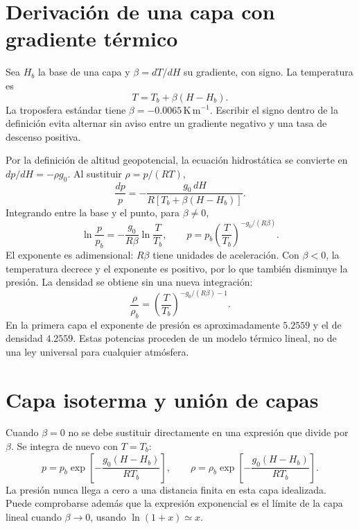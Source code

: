 \section{Derivación de una capa con gradiente térmico}
Sea $H_b$ la base de una capa y $\beta=dT/dH$ su gradiente, con signo. La temperatura es
\begin{equation}\label{eq:04-T}
 T=T_b+\beta(H-H_b).
\end{equation}
La troposfera estándar tiene $\beta=-0.0065\,\mathrm{K\,m^{-1}}$. Escribir el signo dentro de la definición evita alternar sin aviso entre un gradiente negativo y una tasa de descenso positiva.

Por la definición de altitud geopotencial, la ecuación hidrostática se convierte en $dp/dH=-\rho g_0$. Al sustituir $\rho=p/(RT)$,
\begin{equation}
 \frac{dp}{p}=-\frac{g_0\,dH}{R[T_b+\beta(H-H_b)]}.
\end{equation}
Integrando entre la base y el punto, para $\beta\ne0$,
\begin{equation}\label{eq:04-p}
 \ln\frac{p}{p_b}=-\frac{g_0}{R\beta}\ln\frac{T}{T_b},\qquad
 p=p_b\left(\frac{T}{T_b}\right)^{-g_0/(R\beta)}.
\end{equation}
El exponente es adimensional: $R\beta$ tiene unidades de aceleración. Con $\beta<0$, la temperatura decrece y el exponente es positivo, por lo que también disminuye la presión. La densidad se obtiene sin una nueva integración:
\begin{equation}\label{eq:04-rho}
 \frac{\rho}{\rho_b}=\left(\frac{T}{T_b}\right)^{-g_0/(R\beta)-1}.
\end{equation}
En la primera capa el exponente de presión es aproximadamente $5.2559$ y el de densidad $4.2559$. Estas potencias proceden de un modelo térmico lineal, no de una ley universal para cualquier atmósfera.

\section{Capa isoterma y unión de capas}
Cuando $\beta=0$ no se debe sustituir directamente en una expresión que divide por $\beta$. Se integra de nuevo con $T=T_b$:
\begin{equation}\label{eq:04-iso}
 p=p_b\exp\left[-\frac{g_0(H-H_b)}{RT_b}\right],\qquad
 \rho=\rho_b\exp\left[-\frac{g_0(H-H_b)}{RT_b}\right].
\end{equation}
La presión nunca llega a cero a una distancia finita en esta capa idealizada. Puede comprobarse además que la expresión exponencial es el límite de la capa lineal cuando $\beta\to0$, usando $\ln(1+x)\simeq x$.


